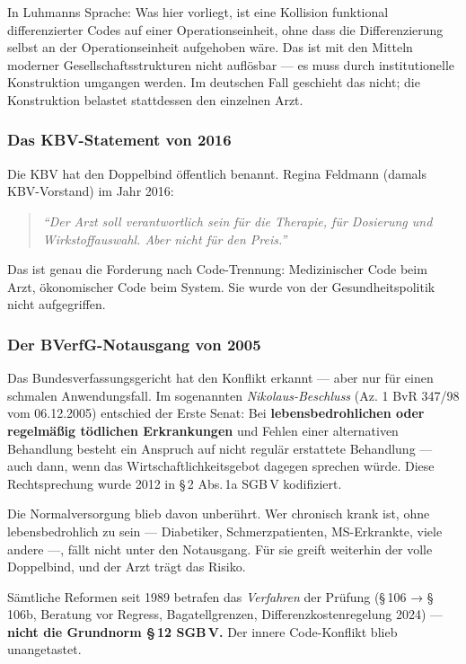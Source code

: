 \documentclass{umbruch-position}
\begin{document}
In Luhmanns Sprache: Was hier vorliegt, ist eine Kollision funktional differenzierter Codes auf einer Operationseinheit, ohne dass die Differenzierung selbst an der Operationseinheit aufgehoben wäre. Das ist mit den Mitteln moderner Gesellschaftsstrukturen nicht auflösbar — es muss durch institutionelle Konstruktion umgangen werden. Im deutschen Fall geschieht das nicht; die Konstruktion belastet stattdessen den einzelnen Arzt.

\subsubsection{Das KBV-Statement von 2016}

Die KBV hat den Doppelbind öffentlich benannt. Regina Feldmann (damals KBV-Vorstand) im Jahr 2016:

\begin{quote}
\textit{``Der Arzt soll verantwortlich sein für die Therapie, für Dosierung und Wirkstoffauswahl. Aber nicht für den Preis.''}
\end{quote}

Das ist genau die Forderung nach Code-Trennung: Medizinischer Code beim Arzt, ökonomischer Code beim System. Sie wurde von der Gesundheitspolitik nicht aufgegriffen.

\subsubsection{Der BVerfG-Notausgang von 2005}

Das Bundesverfassungsgericht hat den Konflikt erkannt — aber nur für einen schmalen Anwendungsfall. Im sogenannten \textit{Nikolaus-Beschluss} (Az. 1 BvR 347/98 vom 06.12.2005) entschied der Erste Senat: Bei \textbf{lebensbedrohlichen oder regelmäßig tödlichen Erkrankungen} und Fehlen einer alternativen Behandlung besteht ein Anspruch auf nicht regulär erstattete Behandlung — auch dann, wenn das Wirtschaftlichkeitsgebot dagegen sprechen würde. Diese Rechtsprechung wurde 2012 in \S\,2 Abs.\,1a SGB\,V kodifiziert.

Die Normalversorgung blieb davon unberührt. Wer chronisch krank ist, ohne lebensbedrohlich zu sein — Diabetiker, Schmerzpatienten, MS-Erkrankte, viele andere —, fällt nicht unter den Notausgang. Für sie greift weiterhin der volle Doppelbind, und der Arzt trägt das Risiko.

Sämtliche Reformen seit 1989 betrafen das \textit{Verfahren} der Prüfung (\S\,106 → \S\,106b, Beratung vor Regress, Bagatellgrenzen, Differenzkostenregelung 2024) — \textbf{nicht die Grundnorm \S\,12 SGB\,V.} Der innere Code-Konflikt blieb unangetastet.
\end{document}
